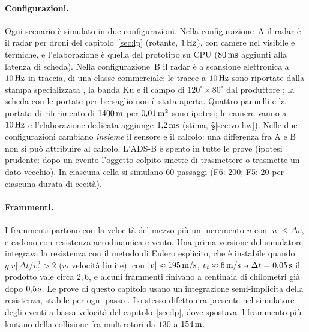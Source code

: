 \paragraph{Configurazioni.} Ogni scenario è simulato in due configurazioni. Nella configurazione~A il radar è il radar per droni del capitolo~\ref{sec:lp} (rotante, $1\,\mathrm{Hz}$), con camere nel visibile e termiche, e l'elaborazione è quella del prototipo su CPU ($80\,\mathrm{ms}$ aggiunti alla latenza di scheda). Nella configurazione~B il radar è a scansione elettronica a $10\,\mathrm{Hz}$ in traccia, di una classe commerciale: le tracce a $10\,\mathrm{Hz}$ sono riportate dalla stampa specializzata \citep{dronedj2026-echodyne}, la banda Ku e il campo di $120^\circ\times80^\circ$ dal produttore \citep{echodyne-tradegov-2024,echodyne-echoshield-news}; la scheda con le portate per bersaglio non è stata aperta. Quattro pannelli e la portata di riferimento di $1400\,\mathrm{m}$ per $0{,}01\,\mathrm{m^2}$ sono ipotesi; le camere vanno a $10\,\mathrm{Hz}$ e l'elaborazione dedicata aggiunge $1{,}2\,\mathrm{ms}$ (stima, \S\ref{sec:vo-hw}). Nelle due configurazioni cambiano \emph{insieme} il sensore e il calcolo: una differenza fra A e B non si può attribuire al calcolo. L'ADS-B è spento in tutte le prove (ipotesi prudente: dopo un evento l'oggetto colpito smette di trasmettere o trasmette un dato vecchio). In ciascuna cella si simulano 60 passaggi (F6: 200; F5: 20 per ciascuna durata di cecità).

\paragraph{Frammenti.} I frammenti partono con la velocità del mezzo più un incremento $u$ con $|u|\le\Delta v$, e cadono con resistenza aerodinamica e vento. Una prima versione del simulatore integrava la resistenza con il metodo di Eulero esplicito, che è instabile quando $g|v|\,\Delta t/v_t^2>2$ ($v_t$ velocità limite): con $|v|\approx195\,\mathrm{m/s}$, $v_t\approx6\,\mathrm{m/s}$ e $\Delta t=0{,}05\,\mathrm{s}$ il prodotto vale circa $2{,}6$, e alcuni frammenti finivano a centinaia di chilometri già dopo $0{,}5\,\mathrm{s}$. Le prove di questo capitolo usano un'integrazione semi-implicita della resistenza, stabile per ogni passo . Lo stesso difetto era presente nel simulatore degli eventi a bassa velocità del capitolo~\ref{sec:lp}, dove spostava il frammento più lontano della collisione fra multirotori da $130$ a $154\,\mathrm{m}$.

